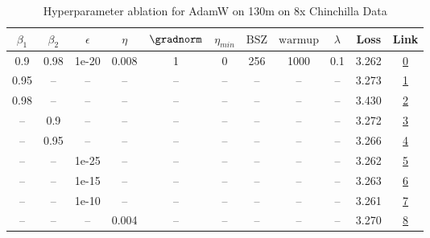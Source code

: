 \begin{table}[H]
\centering
\caption{Hyperparameter ablation for AdamW on 130m on 8x Chinchilla Data}
\label{tab:ablation_adamw_130m_on_8x_chinchilla_data}
\begin{tabular}{ccccccccccc}
\toprule
$\beta_1$ & $\beta_2$ & $\epsilon$ & $\eta$ & $\gradnorm$ & $\eta_{min}$ & $\mathrm{BSZ}$ & $\mathrm{warmup}$ & $\lambda$ & Loss & Link \\
\midrule
0.9 & 0.98 & 1e-20 & 0.008 & 1 & 0 & 256 & 1000 & 0.1 & 3.262 & \href{https://wandb.ai/stanford-mercury/optimizer-scaling/runs/sweep-130m-21B-adamwc00703lr0.008-wd0.1-minlr0-warmup1000-b10.9--d73c2c}{0} \\
\midrule
0.95 & -- & -- & -- & -- & -- & -- & -- & -- & 3.273 & \href{https://wandb.ai/stanford-mercury/optimizer-scaling/runs/sweep-130m-21B-adamwd5d639lr0.008-wd0.1-minlr0-warmup1000-b10.95-658eb8}{1} \\
0.98 & -- & -- & -- & -- & -- & -- & -- & -- & 3.430 & \href{https://wandb.ai/stanford-mercury/optimizer-scaling/runs/sweep-130m-21B-adamw0cb2d6lr0.008-wd0.1-minlr0-warmup1000-b10.98-7c952d}{2} \\
-- & 0.9 & -- & -- & -- & -- & -- & -- & -- & 3.272 & \href{https://wandb.ai/stanford-mercury/optimizer-scaling/runs/sweep-130m-21B-adamwe479a6lr0.008-wd0.1-minlr0-warmup1000-b10.9--7570fe}{3} \\
-- & 0.95 & -- & -- & -- & -- & -- & -- & -- & 3.266 & \href{https://wandb.ai/stanford-mercury/optimizer-scaling/runs/sweep-130m-21B-adamw63b609lr0.008-wd0.1-minlr0-warmup1000-b10.9--2da2b5}{4} \\
-- & -- & 1e-25 & -- & -- & -- & -- & -- & -- & 3.262 & \href{https://wandb.ai/stanford-mercury/optimizer-scaling/runs/sweep-130m-21B-adamwc0b69dlr0.008-wd0.1-minlr0-warmup1000-b10.9--2390cc}{5} \\
-- & -- & 1e-15 & -- & -- & -- & -- & -- & -- & 3.263 & \href{https://wandb.ai/stanford-mercury/optimizer-scaling/runs/sweep-130m-21B-adamw9248c1lr0.008-wd0.1-minlr0-warmup1000-b10.9--7ae1a8}{6} \\
-- & -- & 1e-10 & -- & -- & -- & -- & -- & -- & 3.261 & \href{https://wandb.ai/stanford-mercury/optimizer-scaling/runs/sweep-130m-21B-adamw357d4clr0.008-wd0.1-minlr0-warmup1000-b10.9--27bdc1}{7} \\
-- & -- & -- & 0.004 & -- & -- & -- & -- & -- & 3.270 & \href{https://wandb.ai/stanford-mercury/optimizer-scaling/runs/sweep-130m-21B-adamwdb2f39lr0.004-wd0.1-minlr0-warmup1000-b10.9--cf39b6}{8} \\

\end{tabular}
\end{table}
